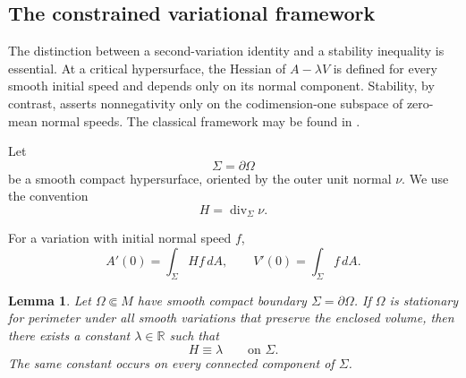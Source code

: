 \documentclass[11pt,reqno]{amsart}
\numberwithin{equation}{section}
\newtheorem{lemma}[theorem]{Lemma}
\theoremstyle{definition}
\theoremstyle{remark}
\newcommand{\divSigma}{\operatorname{div}_{\Sigma}}
\begin{document}
\subsection{The constrained variational framework}\label{sec:Hessian}

The distinction between a second-variation identity and a stability
inequality is essential.  At a critical hypersurface, the Hessian of
$A-\lambda V$ is defined for every smooth initial speed and depends only on
its normal component.  Stability, by contrast, asserts nonnegativity only
on the codimension-one subspace of zero-mean normal speeds.  The classical
framework may be found in
\cite{BarbosaDoCarmo1984,BarbosaDoCarmoEschenburg1988,Ritore2023}.

Let
\[
\Sigma=\partial\Omega
\]
be a smooth compact hypersurface, oriented by the outer unit normal
\(\nu\). We use the convention
\[
H=\divSigma\nu.
\]

For a variation with initial normal speed \(f\),
\[
A'(0)=\int_\Sigma Hf\,dA,
\qquad
V'(0)=\int_\Sigma f\,dA.
\]

\begin{lemma}
\label{lem:stationarity-implies-cmc}
Let $\Omega\Subset M$ have smooth compact boundary $\Sigma=\partial\Omega$.
If $\Omega$ is stationary for perimeter under all smooth variations that
preserve the enclosed volume, then there exists a constant
$\lambda\in\mathbb R$ such that
\[
H\equiv\lambda
\qquad\text{on }\Sigma.
\]
The same constant occurs on every connected component of $\Sigma$.
\end{lemma}
\end{document}
